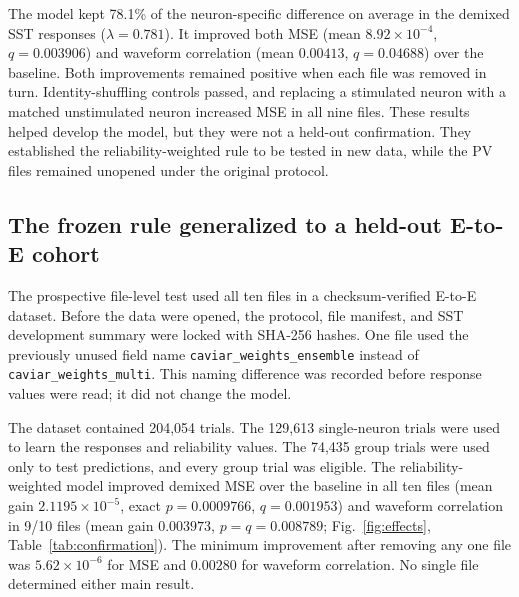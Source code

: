 \documentclass[10pt,twocolumn]{article}
\begin{document}
The model kept 78.1\% of the neuron-specific difference on average in the
demixed SST responses ($\lambda=0.781$). It improved both MSE (mean
$8.92\times10^{-4}$, $q=0.003906$) and waveform correlation (mean $0.00413$,
$q=0.04688$) over the baseline. Both improvements remained positive when
each file was removed in turn. Identity-shuffling controls passed, and
replacing a stimulated neuron with a matched unstimulated neuron increased
MSE in all nine files. These results helped develop the model, but they were
not a held-out confirmation. They established the
reliability-weighted rule to be tested in new data, while the PV files
remained unopened under the original protocol.

\begin{table}[t]
  \centering
  \caption{\textbf{The three stages of the analysis.} Effects are file-level
  means for the neuron-specific model relative to the baseline that knows
  laser power but not neuron identity. The reliability-weighted SST result
  was used for development, not held-out confirmation.}
  \label{tab:cohorts}
  \resizebox{\textwidth}{!}{}
\end{table}

\subsection{The frozen rule generalized to a held-out E-to-E cohort}

The prospective file-level test used all ten files in a checksum-verified E-to-E
dataset. Before the data were opened, the protocol, file manifest, and SST
development summary were locked with SHA-256 hashes. One file used the
previously unused field name \texttt{caviar\_weights\_ensemble} instead of
\texttt{caviar\_weights\_multi}. This naming difference was recorded before
response values were read; it did not change the model.

The dataset contained 204,054 trials. The 129,613 single-neuron trials were
used to learn the responses and reliability values. The 74,435 group trials
were used only to test predictions, and every group trial was eligible. The
reliability-weighted model improved demixed MSE over the baseline in all ten
files (mean gain
$2.1195\times10^{-5}$, exact $p=0.0009766$, $q=0.001953$) and waveform
correlation in 9/10 files (mean gain $0.003973$, $p=q=0.008789$;
Fig.~\ref{fig:effects}, Table~\ref{tab:confirmation}). The minimum
improvement after removing any one file was $5.62\times10^{-6}$ for MSE and
$0.00280$ for waveform correlation. No single file determined either main
result.
\end{document}
